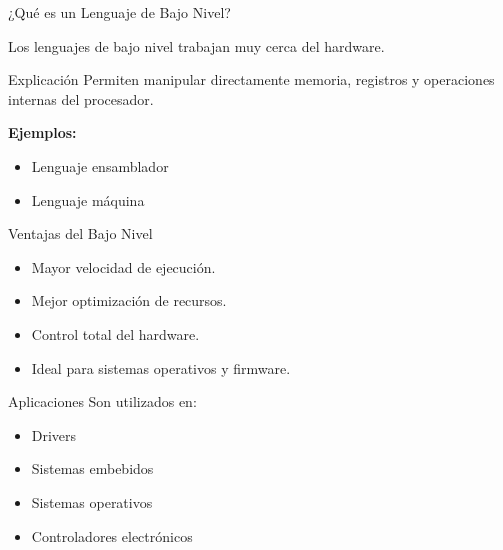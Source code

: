 \documentclass[10pt, aspectratio=169]{beamer}
\begin{document}
	\begin{frame}{¿Qué es un Lenguaje de Bajo Nivel?}
		
		Los lenguajes de bajo nivel trabajan muy cerca del hardware.
		
		\vspace{0.5cm}
		
		\begin{block}{Explicación}
			Permiten manipular directamente memoria, registros y operaciones internas del procesador.
		\end{block}
		
		\vspace{0.4cm}
		
		\textbf{Ejemplos:}
		
		\begin{itemize}
			\item Lenguaje ensamblador
			\item Lenguaje máquina
		\end{itemize}
		
	\end{frame}
	
	\begin{frame}{Ventajas del Bajo Nivel}
		
		\begin{itemize}
			\item Mayor velocidad de ejecución.
			\item Mejor optimización de recursos.
			\item Control total del hardware.
			\item Ideal para sistemas operativos y firmware.
		\end{itemize}
		
		\vspace{0.5cm}
		
		\begin{block}{Aplicaciones}
			Son utilizados en:
			\begin{itemize}
				\item Drivers
				\item Sistemas embebidos
				\item Sistemas operativos
				\item Controladores electrónicos
			\end{itemize}
		\end{block}
		
	\end{frame}
	
\end{document}
